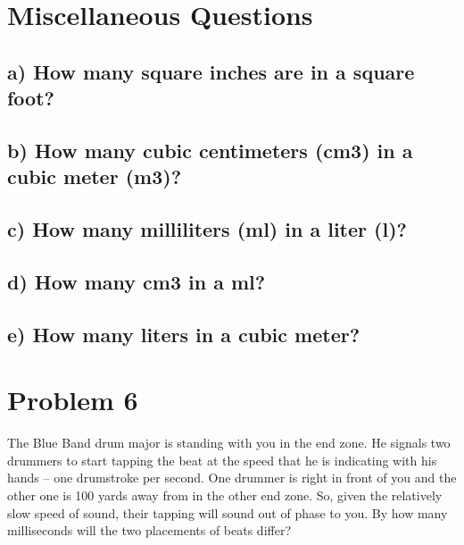 \documentclass[]{article}
\begin{document}
\section{Miscellaneous Questions}\label{miscellaneous-questions}

\subsection{a) How many square inches are in a square
foot?}\label{a-how-many-square-inches-are-in-a-square-foot}

\subsection{b) How many cubic centimeters (cm3) in a cubic meter
(m3)?}\label{b-how-many-cubic-centimeters-cm3-in-a-cubic-meter-m3}

\subsection{c) How many milliliters (ml) in a liter
(l)?}\label{c-how-many-milliliters-ml-in-a-liter-l}

\subsection{d) How many cm3 in a ml?}\label{d-how-many-cm3-in-a-ml}

\subsection{e) How many liters in a cubic
meter?}\label{e-how-many-liters-in-a-cubic-meter}

\section{Problem 6}\label{problem-6}

The Blue Band drum major is standing with you in the end zone. He
signals two drummers to start tapping the beat at the speed that he is
indicating with his hands -- one drumstroke per second. One drummer is
right in front of you and the other one is 100 yards away from in the
other end zone. So, given the relatively slow speed of sound, their
tapping will sound out of phase to you. By how many milliseconds will
the two placements of beats differ?
\end{document}
